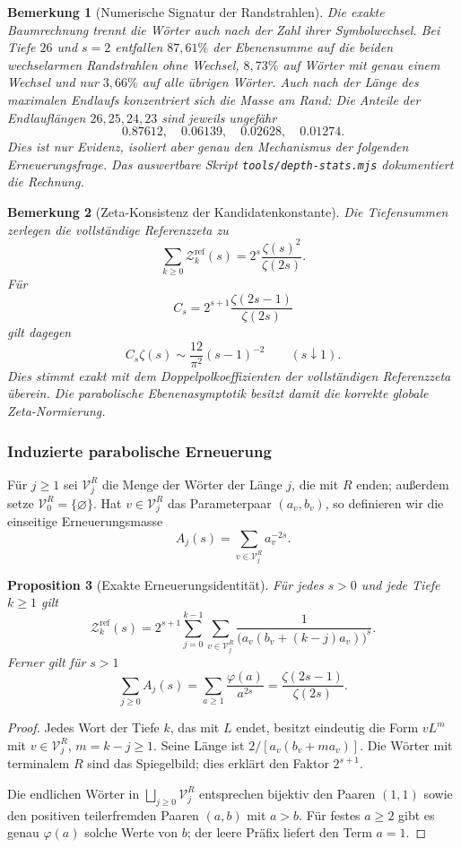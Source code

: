 \documentclass[11pt,a4paper]{article}
\newtheorem{remark}{Bemerkung}[section]
\newtheorem{proposition}[remark]{Proposition}
\begin{document}
\begin{remark}[Numerische Signatur der Randstrahlen]
Die exakte Baumrechnung trennt die W\"orter auch nach der Zahl ihrer
Symbolwechsel. Bei Tiefe $26$ und $s=2$ entfallen $87{,}61\%$ der
Ebenensumme auf die beiden wechselarmen Randstrahlen ohne Wechsel,
$8{,}73\%$ auf W\"orter mit genau einem Wechsel und nur $3{,}66\%$ auf
alle \"ubrigen W\"orter. Auch nach der L\"ange des maximalen Endlaufs
konzentriert sich die Masse am Rand: Die Anteile der Endlaufl\"angen
$26,25,24,23$ sind jeweils ungef\"ahr
\[
 0.87612,\quad 0.06139,\quad 0.02628,\quad 0.01274.
\]
Dies ist nur Evidenz, isoliert aber genau den Mechanismus der folgenden
Erneuerungsfrage. Das auswertbare Skript
\texttt{tools/depth-stats.mjs} dokumentiert die Rechnung.
\end{remark}

\begin{remark}[Zeta-Konsistenz der Kandidatenkonstante]
Die Tiefensummen zerlegen die vollständige Referenzzeta zu
\[
 \sum_{k\ge0}\mathcal Z_k^{\mathrm{ref}}(s)
 =2^s\frac{\zeta(s)^2}{\zeta(2s)}.
\]
Für
\[
 C_s=2^{s+1}\frac{\zeta(2s-1)}{\zeta(2s)}
\]
gilt dagegen
\[
 C_s\zeta(s)\sim\frac{12}{\pi^2}(s-1)^{-2}
 \qquad(s\downarrow1).
\]
Dies stimmt exakt mit dem Doppelpolkoeffizienten der vollständigen
Referenzzeta überein. Die parabolische Ebenenasymptotik besitzt damit
die korrekte globale Zeta-Normierung.
\end{remark}

\subsubsection{Induzierte parabolische Erneuerung}

Für $j\ge1$ sei $\mathcal V_j^R$ die Menge der Wörter der Länge $j$,
die mit $R$ enden; außerdem setze
$\mathcal V_0^R=\{\varnothing\}$. Hat
$v\in\mathcal V_j^R$ das Parameterpaar $(a_v,b_v)$, so definieren wir
die einseitige Erneuerungsmasse
\[
 A_j(s)=\sum_{v\in\mathcal V_j^R}a_v^{-2s}.
\]

\begin{proposition}[Exakte Erneuerungsidentität]
Für jedes $s>0$ und jede Tiefe $k\ge1$ gilt
\[
 \mathcal Z_k^{\mathrm{ref}}(s)
 =
 2^{s+1}\sum_{j=0}^{k-1}
 \sum_{v\in\mathcal V_j^R}
 \frac{1}{\bigl(a_v(b_v+(k-j)a_v)\bigr)^s}.
\]
Ferner gilt für $s>1$
\[
 \sum_{j\ge0}A_j(s)
 =
 \sum_{a\ge1}\frac{\varphi(a)}{a^{2s}}
 =
 \frac{\zeta(2s-1)}{\zeta(2s)}.
\]
\end{proposition}

\begin{proof}
Jedes Wort der Tiefe $k$, das mit $L$ endet, besitzt eindeutig die Form
$vL^m$ mit $v\in\mathcal V_j^R$, $m=k-j\ge1$. Seine Länge ist
$2/[a_v(b_v+ma_v)]$. Die Wörter mit terminalem $R$ sind das Spiegelbild;
dies erklärt den Faktor $2^{s+1}$.

Die endlichen Wörter in
$\bigsqcup_{j\ge0}\mathcal V_j^R$ entsprechen bijektiv den Paaren
$(1,1)$ sowie den positiven teilerfremden Paaren $(a,b)$ mit $a>b$.
Für festes $a\ge2$ gibt es genau $\varphi(a)$ solche Werte von $b$;
der leere Präfix liefert den Term $a=1$.
\end{proof}
\end{document}

